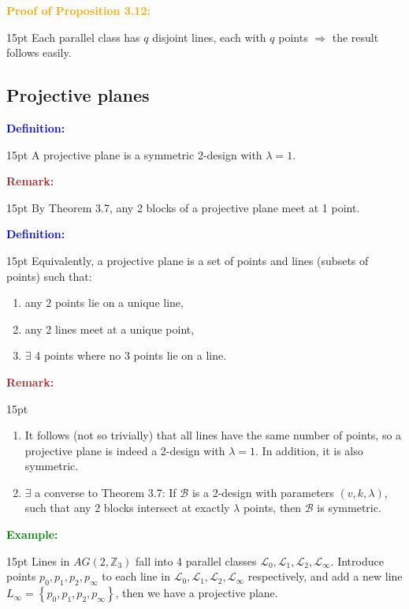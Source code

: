 \documentclass[12pt]{article}
\newcommand{\noparskip}{\vspace{-\parskip}}
\newenvironment{points}
	{\begin{enumerate}[label = (\arabic*)]}
	{\end{enumerate}}
\newenvironment{dent}
	{\begin{adjustwidth}{15pt}{}\noparskip}
	{\end{adjustwidth}}
\newenvironment{proof}[1]
	{\textcolor{Orange}{\textbf{Proof of #1:}}\begin{dent}}
	{\end{dent}}
\newenvironment{definition}
	{\textcolor{Blue}{\textbf{Definition:}}\begin{dent}}
	{\end{dent}}
\newenvironment{example}
	{\textcolor{Green}{\textbf{Example:}}\begin{dent}}
	{\end{dent}}
\newenvironment{remark}
	{\textcolor{Brown}{\textbf{Remark:}}\begin{dent}}
	{\end{dent}}
\renewcommand{\implies}{\Rightarrow}
\newcommand{\set}[1]{\left\{ #1 \right\}}
\newcommand{\Z}{\mathbb{Z}}
\newcommand{\cB}{\mathcal{B}}
\newcommand{\cL}{\mathcal{L}}
\begin{document}
\begin{proof}{Proposition 3.12}
Each parallel class has $q$ disjoint lines, each with $q$ points $\implies$ the result follows easily.
\end{proof}

\subsection{Projective planes}

\begin{definition}
A projective plane is a symmetric 2-design with $\lambda = 1$.
\end{definition}

\begin{remark}
By Theorem 3.7, any 2 blocks of a projective plane meet at 1 point.
\end{remark}

\begin{definition}
Equivalently, a projective plane is a set of points and lines (subsets of points) such that:
\noparskip
\begin{points}
\item any 2 points lie on a unique line,
\item any 2 lines meet at a unique point,
\item $\exists$ 4 points where no 3 points lie on a line.
\end{points}
\end{definition}

\begin{remark}
\begin{points}
\item It follows (not so trivially) that all lines have the same number of points, so a projective plane is indeed a 2-design with $\lambda = 1$. In addition, it is also symmetric.
\item $\exists$ a converse to Theorem 3.7: If $\cB$ is a 2-design with parameters $(v, k, \lambda)$, such that any 2 blocks intersect at exactly $\lambda$ points, then $\cB$ is symmetric.
\end{points}
\end{remark}

\begin{example}
Lines in $AG(2, \Z_3)$ fall into 4 parallel classes $\cL_0, \cL_1, \cL_2, \cL_\infty$. Introduce points $p_0, p_1, p_2, p_\infty$ to each line in $\cL_0, \cL_1, \cL_2, \cL_\infty$ respectively, and add a new line $L_\infty = \set{p_0, p_1, p_2, p_\infty}$, then we have a projective plane.
\end{example}
\end{document}
